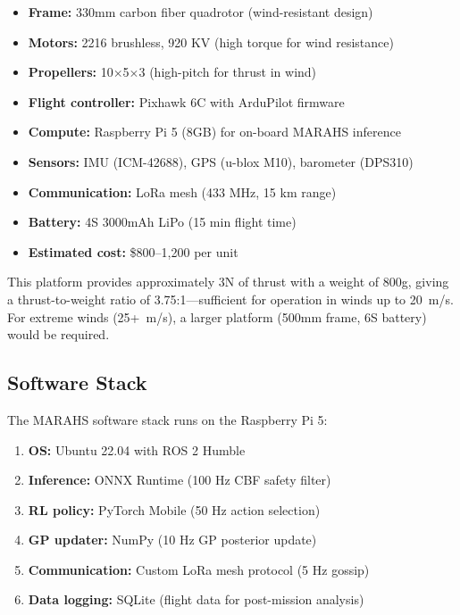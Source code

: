 \documentclass[12pt,a4paper]{article}
\begin{document}
\begin{itemize}[leftmargin=*]
    \item \textbf{Frame:} 330mm carbon fiber quadrotor (wind-resistant design)
    \item \textbf{Motors:} 2216 brushless, 920 KV (high torque for wind resistance)
    \item \textbf{Propellers:} 10$\times$5$\times$3 (high-pitch for thrust in wind)
    \item \textbf{Flight controller:} Pixhawk 6C with ArduPilot firmware
    \item \textbf{Compute:} Raspberry Pi 5 (8GB) for on-board MARAHS inference
    \item \textbf{Sensors:} IMU (ICM-42688), GPS (u-blox M10), barometer (DPS310)
    \item \textbf{Communication:} LoRa mesh (433 MHz, 15 km range)
    \item \textbf{Battery:} 4S 3000mAh LiPo (15 min flight time)
    \item \textbf{Estimated cost:} \$800--1,200 per unit
\end{itemize}

This platform provides approximately 3N of thrust with a weight of 800g, giving a thrust-to-weight ratio of 3.75:1---sufficient for operation in winds up to 20~m/s. For extreme winds (25+~m/s), a larger platform (500mm frame, 6S battery) would be required.

\subsection{Software Stack}

The MARAHS software stack runs on the Raspberry Pi 5:

\begin{enumerate}[leftmargin=*]
    \item \textbf{OS:} Ubuntu 22.04 with ROS 2 Humble
    \item \textbf{Inference:} ONNX Runtime (100 Hz CBF safety filter)
    \item \textbf{RL policy:} PyTorch Mobile (50 Hz action selection)
    \item \textbf{GP updater:} NumPy (10 Hz GP posterior update)
    \item \textbf{Communication:} Custom LoRa mesh protocol (5 Hz gossip)
    \item \textbf{Data logging:} SQLite (flight data for post-mission analysis)
\end{enumerate}
\end{document}
